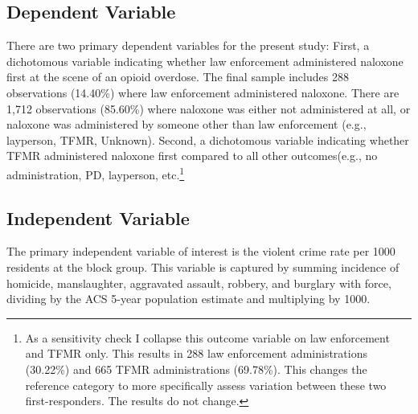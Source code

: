 \subsection{Dependent Variable}
There are two primary dependent variables for the present study: First, a dichotomous variable indicating whether law enforcement administered naloxone first at the scene of an opioid overdose. The final sample includes 288 observations (14.40\%) where law enforcement administered naloxone. There are 1,712 observations (85.60\%) where naloxone was either not administered at all, or naloxone was administered by someone other than law enforcement (e.g., layperson, TFMR, Unknown). Second, a dichotomous variable indicating whether TFMR administered naloxone first compared to all other outcomes(e.g., no administration, PD, layperson, etc.\footnote{As a sensitivity check I collapse this outcome variable on law enforcement and TFMR only. This results in 288 law enforcement administrations (30.22\%) and 665 TFMR administrations (69.78\%). This changes the reference category to more specifically assess variation between these two first-responders. The results do not change.}

\subsection{Independent Variable}
The primary independent variable of interest is the violent crime rate per 1000 residents at the block group. This variable is captured by summing incidence of homicide, manslaughter, aggravated assault, robbery, and burglary with force, dividing by the ACS 5-year population estimate and multiplying by 1000.

